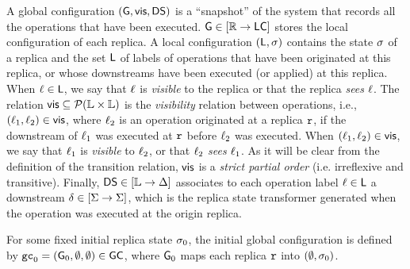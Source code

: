 A global configuration $(\mathsf{G}, \mathsf{vis}, \mathsf{DS})$ is a
``snapshot'' of the system that records all the operations that have
been executed.
$\mathsf{G} \in [\mathbb{R} \rightarrow \mathsf{LC}]$ stores the local
configuration of each replica.
A local configuration $(\mathsf{L}, \sigma)$ contains the state
$\sigma$ of a replica and the set $\mathsf{L}$ of labels of
operations that have been originated at this replica, or whose
downstreams have been executed (or applied) at this replica.
When $\ell\in \mathsf{L}$, we say that $\ell$ is \emph{visible}
to the replica or that the replica \emph{sees} $\ell$.
The relation $\mathsf{vis}\subseteq \mathcal{P}(\mathbb{L} \times \mathbb{L})$ is
the \emph{visibility} relation between operations, i.e.,
$(\ell_1,\ell_2)\in \mathsf{vis}$, where $\ell_2$ is an operation
originated at a replica $\mathtt{r}$, if the downstream of $\ell_1$ was
executed at $\mathtt{r}$ before $\ell_2$ was executed.
When $(\ell_1,\ell_2)\in \mathsf{vis}$, we say that $\ell_1$ is
\emph{visible} to $\ell_2$, or that $\ell_2$ \emph{sees}
$\ell_1$.
As it will be clear from the definition of the transition relation,
$\mathsf{vis}$ is a \emph{strict partial order} (i.e.
irreflexive and transitive).
Finally, $\mathsf{DS}\in [\mathbb{L} \rightarrow \Delta]$ associates to
each operation label $\ell \in \mathsf{L}$ a downstream
$\delta\in [\Sigma \rightarrow \Sigma]$, which is the replica
state transformer generated when the operation was executed at the
origin replica.

For some fixed initial replica state $\sigma_0$, the initial global configuration is defined by $\mathtt{gc}_0 = (\mathsf{G}_0, \emptyset, \emptyset) \in \mathsf{GC}$, where $\mathsf{G}_0$ maps each replica $\mathtt{r}$ into $(\emptyset, \sigma_0)$.


